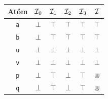 \begin{center}
\begin{tabular}{c|c|c|c|c|c}
Atóm & $\mathcal{I}_0$ & $\mathcal{I}_1$ & $\mathcal{I}_2$ & $\mathcal{I}_3$ & $\mathcal{I}$ \\
\hline
\verb|a| & $\bot$ & $\top$ & $\top$ & $\top$ & $\top$ \\
\verb|b| & $\bot$ & $\top$ & $\top$ & $\top$ & $\top$ \\
\verb|u| & $\bot$ & $\bot$ & $\bot$ & $\bot$ & $\bot$ \\
\verb|v| & $\bot$ & $\bot$ & $\bot$ & $\bot$ & $\bot$ \\
\verb|p| & $\bot$ & $\top$ & $\bot$ & $\top$ & $\Cup$ \\
\verb|q| & $\bot$ & $\top$ & $\bot$ & $\top$ & $\Cup$ \\
\end{tabular}
\end{center}

